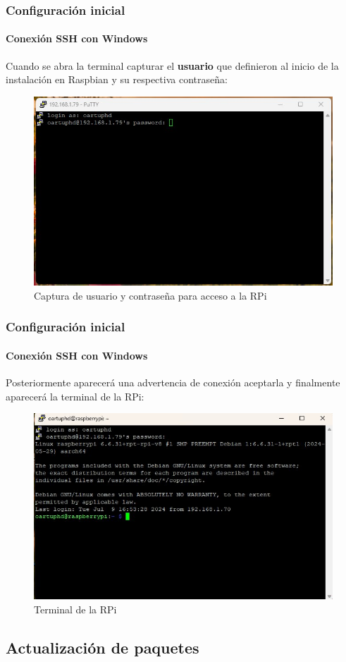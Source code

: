 \documentclass{beamer}
\begin{document}
	\begin{frame}
		\frametitle{Configuración inicial}
		\framesubtitle{Conexión SSH con Windows}
		Cuando se abra la terminal capturar el \textbf{usuario} que definieron al inicio de la instalación en Raspbian y su respectiva contraseña:
		\begin{figure}
			\includegraphics[scale=0.49]{putty2.jpeg}
			\caption{Captura de usuario y contraseña para acceso a la RPi}
		\end{figure}
		
	\end{frame}
	
	\begin{frame}
		\frametitle{Configuración inicial}
		\framesubtitle{Conexión SSH con Windows}
		Posteriormente aparecerá una advertencia de conexión aceptarla y finalmente aparecerá la terminal de la RPi:
		\begin{figure}
			\includegraphics[scale=0.5]{putty3.jpeg}
			\caption{Terminal de la RPi}
		\end{figure}
		
	\end{frame}
	
	
	\subsection{Actualización de paquetes}
\end{document}
